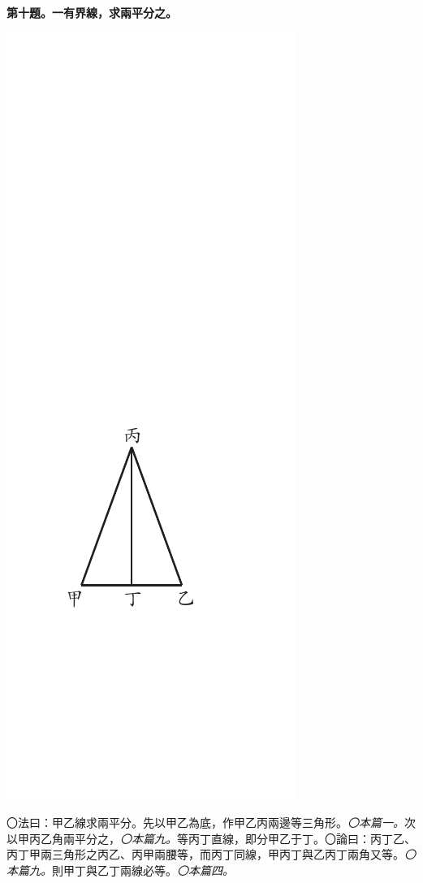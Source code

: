 \documentclass[12pt,b5paper,landscape]{article}
\newcommand{\ccom}[1]{{\footnotesize \emph{〇#1}}}
\newcommand{\bcom}[1]{〇#1}
\newcommand{\cthm}[1]{{
\vspace{8pt}

\bfseries #1}}
\begin{document}
\begin{multicols}{2}
\cthm{第十題。一有界線，求兩平分之。}
\begin{center}
\includegraphics[angle=90]{eu48}
\end{center}
\bcom{法曰：甲乙線求兩平分。先以甲乙為底，作甲乙丙兩邊等三角形。\ccom{本篇一。}次以甲丙乙角兩平分之，\ccom{本篇九。}等丙丁直線，即分甲乙于丁。}\bcom{論曰：丙丁乙、丙丁甲兩三角形之丙乙、丙甲兩腰等，而丙丁同線，甲丙丁與乙丙丁兩角又等。\ccom{本篇九。}則甲丁與乙丁兩線必等。\ccom{本篇四。}}

\end{multicols}
\end{document}

